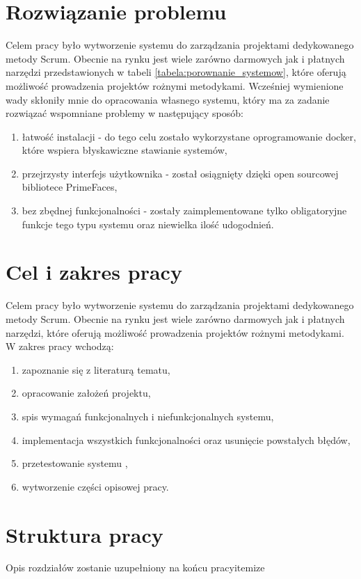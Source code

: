 \section{Rozwiązanie problemu}

Celem pracy było wytworzenie systemu do zarządzania projektami dedykowanego metody Scrum. Obecnie na rynku jest wiele zarówno darmowych jak i płatnych narzędzi przedstawionych w tabeli \ref{tabela:porownanie_systemow}, które oferują możliwość prowadzenia projektów rożnymi metodykami. Wcześniej wymienione wady skłoniły mnie do opracowania własnego systemu, który ma za zadanie rozwiązać wspomniane problemy w następujący sposób:
\begin{enumerate}
	\item łatwość instalacji - do tego celu zostało wykorzystane oprogramowanie docker, które wspiera błyskawiczne stawianie systemów,
	\item przejrzysty interfejs użytkownika - został osiągnięty dzięki open sourcowej bibliotece PrimeFaces,
	\item bez zbędnej funkcjonalności - zostały zaimplementowane tylko obligatoryjne funkcje tego typu systemu oraz niewielka ilość udogodnień.
\end{enumerate}

\section{Cel i zakres pracy}
Celem pracy było wytworzenie systemu do zarządzania projektami dedykowanego metody Scrum. Obecnie na rynku jest wiele zarówno darmowych jak i płatnych narzędzi, które oferują możliwość prowadzenia projektów rożnymi metodykami. W zakres pracy wchodzą:
\begin{enumerate}
	\item zapoznanie się z literaturą tematu,
	\item opracowanie założeń projektu,
	\item spis wymagań funkcjonalnych i niefunkcjonalnych systemu,
	\item implementacja wszystkich funkcjonalności oraz usunięcie powstałych błędów,
	\item przetestowanie systemu ,
	\item wytworzenie części opisowej pracy.
	
\end{enumerate}


\section{Struktura pracy}
Opis rozdziałów zostanie uzupełniony na końcu pracyitemize